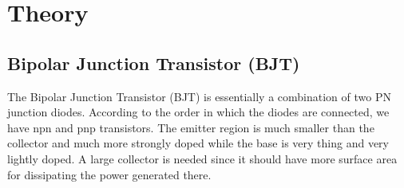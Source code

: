 \section{Theory}

\subsection{Bipolar Junction Transistor (BJT)}
The Bipolar Junction Transistor (BJT) is essentially a combination of two PN junction diodes.  According to the order in which the diodes are connected, we have npn and pnp transistors. The emitter region is much smaller than the collector and much more strongly doped while the base is very thing and very lightly doped. A large collector is needed since it should have more surface area for dissipating the power generated there.\\[0.3cm]
